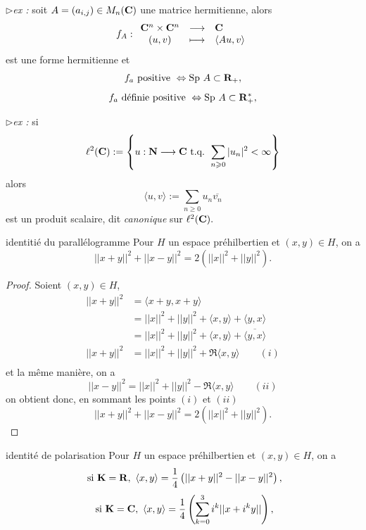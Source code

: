 \documentclass[a4paper,11pt, twoside]{article}
\begin{document}
$\triangleright$\emph{ex :} soit $A=\left(a_{i,j}\right)\in M_n(\mathbf C)$ une matrice hermitienne, alors 
$$f_A:\begin{array}{ccl}
  \mathbf C^n\times\mathbf C^n&\longrightarrow&\mathbf C\\
  (u,v)&\longmapsto&\langle Au,v\rangle
\end{array}$$
est une forme hermitienne et 
$$f_a\text{ positive }\Leftrightarrow\mathrm{Sp}\ A\subset\R_+,$$
$$f_a\text{ définie positive }\Leftrightarrow\mathrm{Sp}\ A\subset\mathbf R_+^*,$$


$\triangleright$\emph{ex :} si 
$$\ell^2(\mathbf C):=\left\{u:\mathbf N\longrightarrow\mathbf C\text{ t.q. } \sum_{n\geqslant 0}|u_n|^2<\infty\right\}$$
alors 
$$\langle u,v\rangle:=\sum_{n\geqslant 0}u_n\overline{v_n}$$
est un produit scalaire, dit \emph{canonique} sur $\ell^2(\mathbf C).$


\begin{propC}{identitié du parallélogramme}
  Pour $H$ un espace préhilbertien et $(x,y)\in H$, on a 
  $$||x+y||^2+||x-y||^2=2\left(||x||^2+||y||^2\right).$$
\end{propC}


\begin{proof}
  Soient $(x,y)\in H$,
  \begin{align*}
    ||x+y||^2&=\langle x+y,x+y\rangle\\
    &=||x||^2+||y||^2+\langle x,y\rangle+\langle y,x\rangle\\
    &=||x||^2+||y||^2+\langle x,y\rangle+\overline{\langle y,x\rangle}\\
    ||x+y||^2&=||x||^2+||y||^2+\Re \langle x,y\rangle\qquad (i)\\
  \end{align*}
  et la même manière, on a 
  $$||x-y||^2=||x||^2+||y||^2-\Re \langle x,y\rangle\qquad (ii)$$
  on obtient donc, en sommant les points $(i)$ et $(ii)$
  $$||x+y||^2+||x-y||^2=2\left(||x||^2+||y||^2\right).$$
\end{proof}


\begin{propC}{identité de polarisation}
  Pour $H$ un espace préhilbertien et $(x,y)\in H$, on a 
  $$\text{ si }\mathbf K=\mathbf R,\ \langle x,y\rangle=\frac14\left(||x+y||^2-||x-y||^2\right),$$
  $$\text{ si }\mathbf K=\mathbf C,\ \langle x,y\rangle=\frac14\left(\sum_{k=0}^3i^k||x+i^ky||\right),$$
\end{propC}
\end{document}
